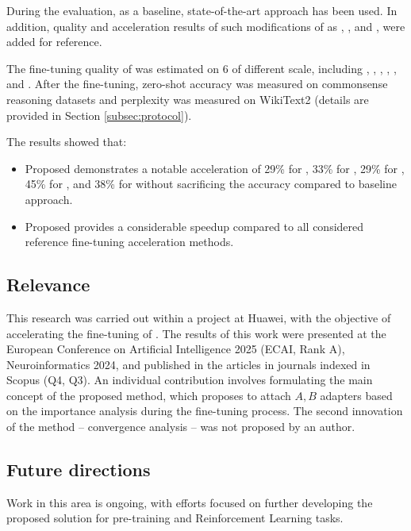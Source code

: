     During the evaluation, as a baseline, state-of-the-art \lora{} approach has been used. In addition, quality and acceleration results of such modifications of \lora{} as \dora{}, \pissa{}, and \adalora{}, were added for reference. 

    The fine-tuning quality of \ourmethodshort{} was estimated on 6 \llms{} of different scale, including \gpt{}, \llamaTwoSmall{}, \llamaTwoBig{}, \qwenSmall{}, \qwenMedium{}, and \qwenLarge{}. After the fine-tuning, zero-shot accuracy was measured on commonsense reasoning datasets and perplexity was measured on WikiText2 (details are provided in Section \ref{subsec:protocol}).

    The results showed that:
    \begin{itemize}
        \item Proposed \ourmethodshort{} demonstrates a notable acceleration of 29\% for \qwenSmall{}, 33\% for \qwenMedium{}, 29\% for \llamaTwoSmall{}, 45\% for \llamaTwoBig{}, and 38\% for \qwenLarge{} without sacrificing the accuracy compared to baseline \lora{} approach. 
        \item Proposed \ourmethodshort{} provides a considerable speedup compared to all considered reference fine-tuning acceleration methods. 
    \end{itemize}

\subsection{Relevance}
    This research was carried out within a project at Huawei, with the objective of accelerating the fine-tuning of \llms{}. The results of this work were presented at the European Conference on Artificial Intelligence 2025 (ECAI, Rank A), Neuroinformatics 2024, and published in the articles in journals indexed in Scopus (Q4, Q3). An individual contribution involves formulating the main concept of the proposed \ourmethodshort{} method, which proposes to attach \lora{} \(A, B\) adapters based on the importance analysis during the fine-tuning process. The second innovation of the method -- convergence analysis -- was not proposed by an author. 

\subsection{Future directions}
    Work in this area is ongoing, with efforts focused on further developing the proposed solution \ourmethodshort{} for pre-training and Reinforcement Learning tasks.

